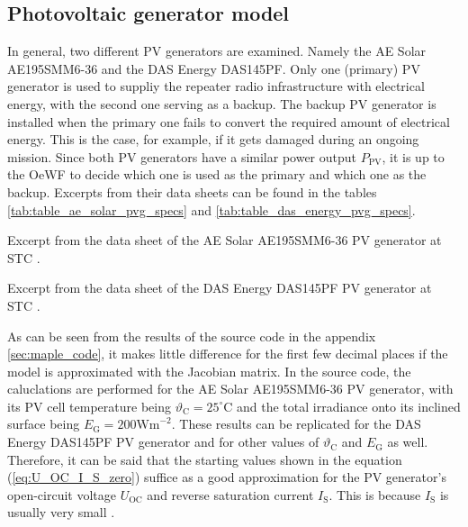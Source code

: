\subsection{Photovoltaic generator model} \label{sec:pv_gen_mod}
In general, two different PV generators are examined. Namely the AE Solar AE195SMM6-36 and the DAS Energy DAS145PF. Only one (primary) PV generator is used to suppliy the repeater radio infrastructure with electrical energy, with the second one serving as a backup. The backup PV generator is installed when the primary one fails to convert the required amount of electrical energy. This is the case, for example, if it gets damaged during an ongoing mission. Since both PV generators have a similar power output $P_\mathrm{PV}$, it is up to the OeWF to decide which one is used as the primary and which one as the backup. Excerpts from their data sheets can be found in the tables \ref{tab:table_ae_solar_pvg_specs} and \ref{tab:table_das_energy_pvg_specs}.
\begin{table}[h!]
	\centering
	
	\caption{Excerpt from the data sheet of the AE Solar AE195SMM6-36 PV generator at STC \cite{ae_solar:2019}.}
	\label{tab:table_ae_solar_pvg_specs}
\end{table}
\begin{table}[h!]
	\centering
	
	\caption{Excerpt from the data sheet of the DAS Energy DAS145PF PV generator at STC \cite{das_energy_2017}.}
	\label{tab:table_das_energy_pvg_specs}
\end{table}

As can be seen from the results of the \MAPLE source code in the appendix \ref{sec:maple_code}, it makes little difference for the first few decimal places if the model is approximated with the Jacobian matrix. In the \MAPLE source code, the caluclations are performed for the AE Solar AE195SMM6-36 PV generator, with its PV cell temperature being $\vartheta_\mathrm{C} = 25^\circ\mathrm{C}$ and the total irradiance onto its inclined surface being $E_\mathrm{G} = 200\mathrm{Wm}^{-2}$. These results can be replicated for the DAS Energy DAS145PF PV generator and for other values of $\vartheta_\mathrm{C}$ and $E_\mathrm{G}$ as well. Therefore, it can be said that the starting values shown in the equation (\ref{eq:U_OC_I_S_zero}) suffice as a good approximation for the PV generator's open-circuit voltage $U_\mathrm{OC}$ and reverse saturation current $I_\mathrm{S}$. This is because $I_\mathrm{S}$ is usually very small \cite{Mertens:2015, Wagner:2018}. 

